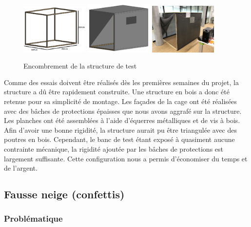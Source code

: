 \begin{figure}[H]
    \centering
    \includegraphics[width=0.3\textwidth]{Images/photos_PGA/P004_CageDeTest21.png}
    \includegraphics[width=0.3\textwidth]{Images/photos_PGA/P004_CageDeTest2.png}
    \includegraphics[width=0.3\textwidth]{Images/photos_PGA/IMG_0442.jpg}
    \caption{Encombrement de la structure de test}
    \label{fig:encombrement}
\end{figure}

Comme des essais doivent être réalisés dès les premières semaines du projet, la structure a dû être
rapidement construite. Une structure en bois a donc été retenue pour sa simplicité de montage. 
Les façades de la cage ont été réalisées avec des bâches de protections épaisses que nous avons aggrafé 
sur la structure. Les planches ont été assemblées à l’aide d’équerres métalliques et de vis à bois.\\
Afin d’avoir une bonne rigidité, la structure aurait pu être triangulée avec des poutres en bois. 
Cependant, le banc de test étant exposé à quasiment aucune contrainte mécanique, la rigidité ajoutée par 
les bâches de protections est largement suffisante. Cette configuration nous a permis d’économiser du 
temps et de l’argent.

\subsection{Fausse neige (confettis)}

\subsubsection{Problématique}

